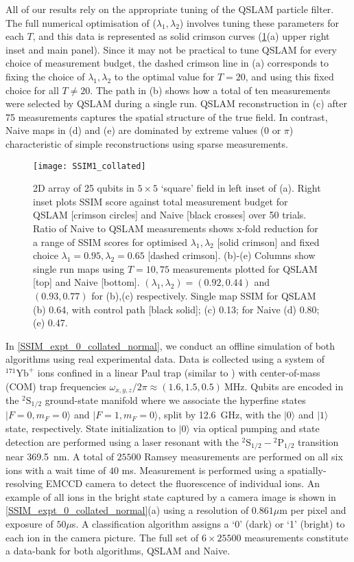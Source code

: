 \documentclass[reprint,longbibliography]{revtex4-1} %
\begin{document}
All of our results rely on the appropriate tuning of the QSLAM particle filter. The full numerical optimisation of  ($\lambda_1, \lambda_2$) involves tuning these parameters for each $T$, and this data is represented as solid crimson curves (\cref{SSIM1_collated}(a) upper right inset and main panel).  Since it may not be practical to tune QSLAM for every choice of measurement budget, the dashed crimson line in (a) corresponds to fixing the choice of $\lambda_1, \lambda_2$ to the optimal value for $T=20$, and using this fixed choice for all $T \neq 20$. The path in (b) shows how  a total of ten measurements were selected by QSLAM during a single run.  QSLAM reconstruction in (c) after 75 measurements captures the spatial structure of the true field. In contrast, Naive maps in (d) and (e) are dominated by extreme values ($0$ or $\pi$) characteristic of simple reconstructions using sparse measurements. 
\begin{figure}
	\texttt{[image: SSIM1\_collated]}
	\caption{\label{SSIM1_collated} 2D array of 25 qubits in $5 \times 5$  `square' field in left inset of (a).  Right inset plots SSIM score against total measurement budget for QSLAM [crimson circles] and Naive [black crosses] over 50 trials. Ratio of Naive to QSLAM measurements shows x-fold reduction for a range of SSIM scores for optimised $\lambda_1, \lambda_2$ [solid crimson] and fixed choice $\lambda_1 = 0.95, \lambda_2 = 0.65$ [dashed crimson]. (b)-(e) Columns show single run maps using $T=10, 75$ measurements plotted for QSLAM [top] and Naive [bottom]. $(\lambda_1, \lambda_2)= (0.92, 0.44)$ and $ (0.93, 0.77)$ for (b),(c) respectively. Single map SSIM for QSLAM (b) 0.64, with control path [black solid]; (c) 0.13; for Naive (d) 0.80;  (e) 0.47. }    	
\end{figure} 

In \cref{SSIM_expt_0_collated_normal}, we conduct an offline simulation of both algorithms using real experimental data. Data is collected using a system of $^{171}\text{Yb}^{+}$ ions confined in a linear Paul trap (similar to \cite{Guggemos:2017}) with center-of-mass (COM) trap frequencies \mbox{$\omega_{x,y,z}/2\pi \approx (1.6,1.5,0.5)~\text{MHz}$}. Qubits are encoded in the $^2\mathrm{S}_{1/2}$ ground-state manifold where we associate the hyperfine states $|F=0, m_F =0\rangle$ and $|F=1, m_F =0\rangle$, split by 12.6~GHz, with the $|0\rangle$ and $|1\rangle$ state, respectively. State initialization to $|0\rangle$ via optical pumping and state detection are performed using a laser resonant with the $^2\mathrm{S}_{1/2} - {^2\mathrm{P}_{1/2}}$ transition near 369.5~nm. A total of $25500$ Ramsey measurements are performed on all six ions with a wait time of $40$ ms. Measurement is performed using a spatially-resolving EMCCD camera to detect the fluorescence of individual ions. An example of all ions in the bright state captured by a camera image is shown in \cref{SSIM_expt_0_collated_normal}(a) using a resolution of $0.861 \mu$m per pixel and exposure of $50 \mu$s. A classification algorithm assigns a `0' (dark) or `1' (bright) to each ion in the camera picture. The full set of $6 \times 25500$ measurements constitute a data-bank for both algorithms, QSLAM and Naive. 
\end{document}

